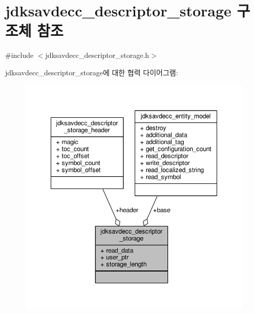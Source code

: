 \hypertarget{structjdksavdecc__descriptor__storage}{}\section{jdksavdecc\+\_\+descriptor\+\_\+storage 구조체 참조}
\label{structjdksavdecc__descriptor__storage}


{\ttfamily \#include $<$jdksavdecc\+\_\+descriptor\+\_\+storage.\+h$>$}



jdksavdecc\+\_\+descriptor\+\_\+storage에 대한 협력 다이어그램\+:
\nopagebreak
\begin{figure}[H]
\begin{center}
\leavevmode
\includegraphics[width=342pt]{structjdksavdecc__descriptor__storage__coll__graph}
\end{center}
\end{figure}
